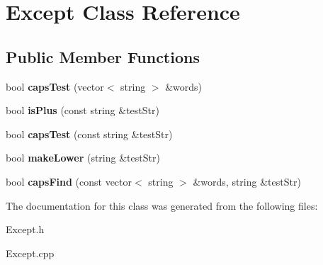 \section{Except Class Reference}
\label{class_except}
\subsection*{Public Member Functions}
\begin{DoxyCompactItemize}
\item 
\mbox{\label{class_except_a4dcf10f84df19d036ef47942903fd534}} 
bool {\bfseries caps\+Test} (vector$<$ string $>$ \&words)
\item 
\mbox{\label{class_except_ad6989cbf276683fb0792bf84ff2c8970}} 
bool {\bfseries is\+Plus} (const string \&test\+Str)
\item 
\mbox{\label{class_except_a63bd105c67d6337be863d730f66ea066}} 
bool {\bfseries caps\+Test} (const string \&test\+Str)
\item 
\mbox{\label{class_except_a98c7a5d43c9d2c5f52c3afa5a85aa143}} 
bool {\bfseries make\+Lower} (string \&test\+Str)
\item 
\mbox{\label{class_except_ac4cf1e5bf27154ef2306a964a80b3203}} 
bool {\bfseries caps\+Find} (const vector$<$ string $>$ \&words, string \&test\+Str)
\end{DoxyCompactItemize}


The documentation for this class was generated from the following files\+:\begin{DoxyCompactItemize}
\item 
Except.\+h\item 
Except.\+cpp\end{DoxyCompactItemize}
